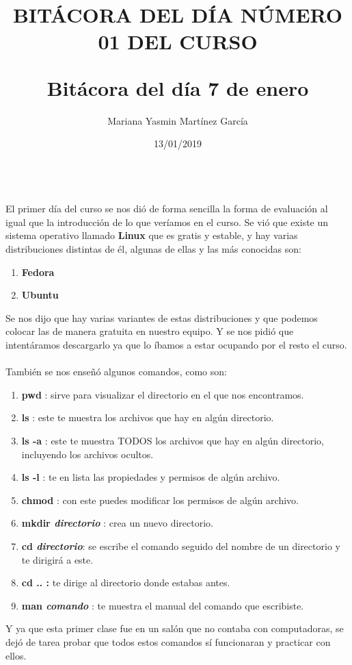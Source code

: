\documentclass[letterpaper, 12pt, twoside]{article}
\title{\Huge\item\color{red}\textbf {BITÁCORA DEL DÍA NÚMERO 01 DEL CURSO}}
\author{Mariana Yasmin Martínez García}
\date{13/01/2019}
\begin{document}
	\maketitle
	\begin{figure}
		\centering
		\caption{}
		\label{fig:1}
	\end{figure}
	
	
	\newpage
	
	\title{\huge\textbf{Bitácora del día 7 de enero\\}} \\
	El primer día del curso se nos dió de forma sencilla la forma de evaluación al igual que la introducción de lo que veríamos en el curso.
	Se vió que existe un sistema operativo llamado \textbf{Linux} que es gratis y estable, y hay varias distribuciones distintas de él, algunas de ellas y las más conocidas son:
	\begin{enumerate}
		\item\textbf{Fedora}
		\item\textbf{Ubuntu}
	\end{enumerate} 
    Se nos dijo que hay varias variantes de estas distribuciones y que podemos colocar las de manera gratuita en nuestro equipo. Y se nos pidió que intentáramos descargarlo ya que lo íbamos a estar ocupando por el resto el curso.\\ \\
   
También se nos enseñó algunos comandos, como son: 
	\begin{enumerate}
		\item \textbf{\large pwd }: sirve para visualizar el directorio en el que nos encontramos.
		\item \textbf{\large ls }: este te muestra los archivos que hay en algún directorio.
		\item \textbf{\large ls -a }: este te muestra TODOS los archivos que hay en algún directorio, incluyendo los archivos ocultos.
		\item \textbf{\large ls -l }: te en lista las propiedades y permisos de algún archivo.
		\item \textbf{\large chmod }: con este puedes modificar los permisos de algún archivo.
		\item \textbf{\large mkdir \textit{directorio} }: crea un nuevo directorio.
		\item \textbf{\large cd \textit{directorio}}: se escribe el comando seguido del nombre de un directorio y te dirigirá a este.
		\item \textbf{\large cd .. :} te dirige al directorio donde estabas antes.
		\item \textbf{\large man \textit{comando} }: te muestra el manual del comando que escribiste.	
	\end{enumerate}
    Y ya que esta primer clase fue en un salón que no contaba con computadoras, se dejó de tarea probar que todos estos comandos sí funcionaran y practicar con ellos.

	
	
	
\end{document}
